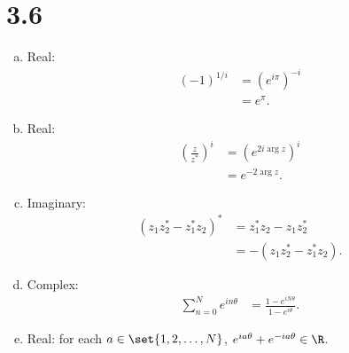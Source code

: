 \documentclass[12pt]{mypackage}
\begin{document}
\section{3.6}%
\begin{enumerate}[(a)]
  \item Real:
    \begin{align*}
      \left(-1\right)^{1/i} &= \left(e^{i\pi}\right)^{-i}\\
                            &= e^{\pi}.
    \end{align*}
  \item Real:
    \begin{align*}
      \left(\frac{z}{z^{\ast}}\right)^{i} &= \left(e^{2i\arg z}\right)^{i}\\
                                          &= e^{-2\arg z}.
    \end{align*}
  \item Imaginary:
    \begin{align*}
      \left(z_1z_2^{\ast} - z_1^{\ast}z_2\right)^{\ast}&= z_1^{\ast}z_2 - z_1z_2^{\ast}\\
                                                       &= -\left(z_1z_2^{\ast} - z_1^{\ast}z_2\right).
    \end{align*}
  \item Complex: 
    \begin{align*}
      \sum_{n=0}^{N}e^{in\theta} &= \frac{1 - e^{iN\theta}}{1 - e^{i\theta}}.
    \end{align*}
  \item Real: for each $a\in \set{1,2,\dots,N}$, $e^{ia\theta} + e^{-ia\theta} \in \R$.
\end{enumerate}
\end{document}
